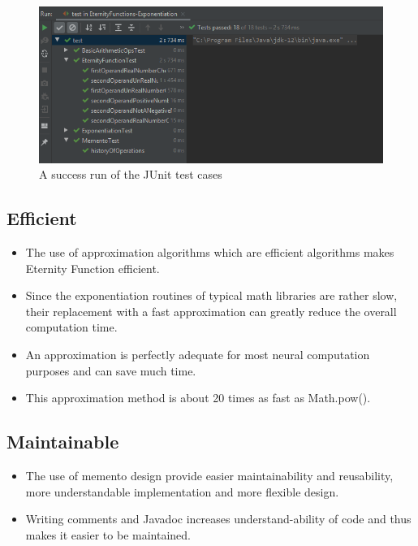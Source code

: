 \documentclass[11pt, english]{report}
\begin{document}
\begin{figure}[H]
  
  \includegraphics[width=1\textwidth]{d2p5.PNG}
  \centering
  \caption{A success run of the JUnit test cases
}
\end{figure}

\subsection{Efficient}

\begin{itemize}
    \item The use of approximation algorithms\cite{power} which are efficient algorithms makes Eternity Function efficient.
    \item Since the exponentiation routines of typical math libraries are rather slow, their replacement with a fast approximation can greatly reduce the overall computation time.
    \item An approximation is perfectly adequate for most neural computation purposes and can save much time.
    \item This approximation method is about 20 times as fast as Math.pow().
\end{itemize}

\subsection{Maintainable}

\begin{itemize}
    \item The use of memento design provide easier maintainability and reusability,
more understandable implementation and more flexible
design.
    \item Writing comments and Javadoc increases understand-ability of code and thus makes it easier to be maintained.
\end{itemize}
\end{document}
